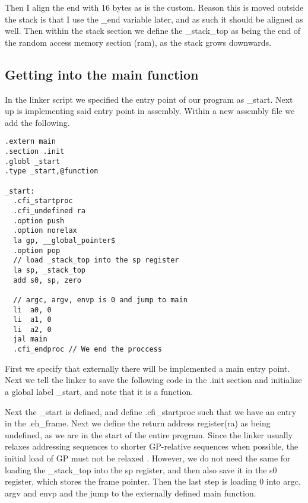 Then I align the end with 16 bytes as is the custom. Reason this is moved outside the stack
is that I use the \_end variable later, and as such it should be aligned as well.
Then within the stack section we define the \_stack\_top as being the end of the random access
memory section (ram), as the stack grows downwards.

\subsection{Getting into the main function}
In the linker script we specified the entry point of our program as \_start. Next up
is implementing said entry point in assembly. Within a new assembly file we add the following.
\begin{lstlisting}
.extern main
.section .init
.globl _start
.type _start,@function

_start:
  .cfi_startproc
  .cfi_undefined ra
  .option push
  .option norelax
  la gp, __global_pointer$
  .option pop
  // load _stack_top into the sp register
  la sp, _stack_top
  add s0, sp, zero

  // argc, argv, envp is 0 and jump to main
  li  a0, 0
  li  a1, 0
  li  a2, 0
  jal main
  .cfi_endproc // We end the proccess
\end{lstlisting}
First we specify that externally there will be implemented a main entry point. Next we tell the
linker to save the following code in the .init section and initialize a global label \_start,
and note that it is a function.

Next the \_start is defined, and define .cfi\_startproc such that we have an entry in the
.eh\_frame. Next we define the return address register(ra) as being undefined, as we are in
the start of the entire program. Since the linker usually relaxes addressing sequences to
shorter GP-relative sequences when possible, the initial load of GP must not be relaxed
\cite{GNU_BIN}. However, we do not need the same for loading the \_stack\_top into the sp
register, and then also save it in the s0 register, which stores the frame pointer.
Then the last step is loading 0 into argc, argv and envp and the jump to the externally
defined main function.

